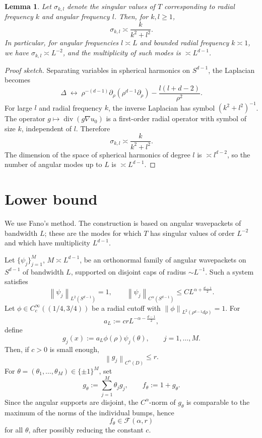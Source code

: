 \documentclass[11pt]{article}
\newtheorem{lemma}[theorem]{Lemma}
\theoremstyle{remark}
\DeclareMathOperator{\div}{div}
\newcommand{\norm}[1]{\left\|#1\right\|}
\begin{document}
\begin{lemma}\label{lem:sv}
Let $\sigma_{k,l}$ denote the singular values of $T$ corresponding to radial
frequency $k$ and angular frequency $l$. Then, for $k,l\ge1$,
\[
\sigma_{k,l}\asymp \frac{k}{k^2+l^2}.
\]
In particular, for angular frequencies $l\asymp L$ and bounded radial frequency
$k\asymp 1$, we have $\sigma_{k,l}\asymp L^{-2}$, and the multiplicity of such
modes is $\asymp L^{d-1}$.
\end{lemma}

\begin{proof}[Proof sketch]
Separating variables in spherical harmonics on $S^{d-1}$, the Laplacian becomes
\[
\Delta \;\longleftrightarrow\;
\rho^{-(d-1)}\partial_\rho(\rho^{d-1}\partial_\rho)
-\frac{l(l+d-2)}{\rho^2}.
\]
For large $l$ and radial frequency $k$, the inverse Laplacian has symbol
$(k^2+l^2)^{-1}$. The operator $g\mapsto \div(g\nabla u_0)$ is a first-order
radial operator with symbol of size $k$, independent of $l$. Therefore
\[
\sigma_{k,l}\asymp \frac{k}{k^2+l^2}.
\]
The dimension of the space of spherical harmonics of degree $l$ is
$\asymp l^{d-2}$, so the number of angular modes up to $L$ is $\asymp L^{d-1}$.
\end{proof}

\section{Lower bound}

We use Fano's method. The construction is based on angular wavepackets of
bandwidth $L$; these are the modes for which $T$ has singular values of order
$L^{-2}$ and which have multiplicity $L^{d-1}$.

Let $\{\psi_j\}_{j=1}^{M}$, $M\asymp L^{d-1}$, be an orthonormal family of
angular wavepackets on $S^{d-1}$ of bandwidth $L$, supported on disjoint caps of
radius $\sim L^{-1}$. Such a system satisfies
\[
\norm{\psi_j}_{L^2(S^{d-1})}=1,\qquad
\norm{\psi_j}_{C^\alpha(S^{d-1})}\le C L^{\alpha+\frac{d-1}{2}}.
\]
Let $\phi\in C_c^\infty((1/4,3/4))$ be a radial cutoff with
$\norm{\phi}_{L^2(\rho^{d-1}d\rho)}=1$. For
\[
a_L:=c r L^{-\alpha-\frac{d-1}{2}},
\]
define
\[
g_j(x):=a_L \phi(\rho)\psi_j(\theta),\qquad j=1,\dots,M.
\]
Then, if $c>0$ is small enough,
\[
\norm{g_j}_{C^\alpha(D)}\le r.
\]
For $\theta=(\theta_1,\dots,\theta_M)\in\{\pm1\}^M$, set
\[
g_\theta:=\sum_{j=1}^M \theta_j g_j,\qquad
f_\theta:=1+g_\theta.
\]
Since the angular supports are disjoint, the $C^\alpha$-norm of $g_\theta$ is
comparable to the maximum of the norms of the individual bumps, hence
\[
f_\theta\in\mathcal F(\alpha,r)
\]
for all $\theta$, after possibly reducing the constant $c$.
\end{document}
